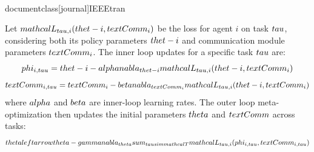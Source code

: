 \\documentclass[journal]{IEEEtran}
\begin{document}
Let $\\mathcal{L}_{\\tau,i}(\\thet-i, \\text{Comm}_i)$ be the loss for agent $i$ on task $\\tau$, considering both its policy parameters $\\thet-i$ and communication module parameters $\\text{Comm}_i$. The inner loop updates for a specific task $\\tau$ are:
$$ \\phi_{i,\\tau} = \\thet-i - \\alpha \\nabla_{\\thet-i} \\mathcal{L}_{\\tau,i}(\\thet-i, \\text{Comm}_i) $$
$$ \\text{Comm}_{i,\\tau} = \\text{Comm}_i - \\beta \\nabla_{\\text{Comm}_i} \\mathcal{L}_{\\tau,i}(\\thet-i, \\text{Comm}_i) $$
where $\\alpha$ and $\\beta$ are inner-loop learning rates. The outer loop meta-optimization then updates the initial parameters $\\theta$ and $\\text{Comm}$ across tasks:
$$ \\theta \\leftarrow \\theta - \\gamma \\nabla_{\\theta} \\sum_{\\tau \\sim \\mathcal{T}} \\mathcal{L}_{\\tau,i}(\\phi_{i,\\tau}, \\text{Comm}_{i,\\tau}) $$
\end{document}
